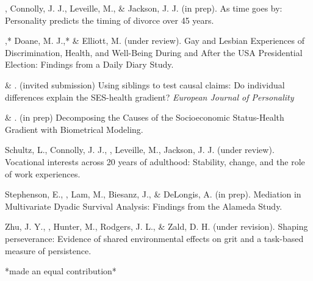 
\item\meb, Connolly, J. J., Leveille, M., \& Jackson, J. J. (in prep). As time goes by: Personality predicts the timing of divorce over 45 years. %
\item\meb,* Doane, M. J.,* \& Elliott, M. (under review). Gay and Lesbian Experiences of Discrimination, Health, and Well-Being During and After the USA Presidential Election: Findings from a Daily Diary Study.  %
\item \meb \& \joe. (invited submission) Using siblings to test causal claims: Do individual differences explain the SES-health gradient? \textit{European Journal of Personality}
\item \meb \& \joe. (in prep) Decomposing the Causes of the Socioeconomic Status-Health Gradient with Biometrical Modeling. %
\item Schultz, L., Connolly, J. J., \meb, Leveille, M., Jackson, J. J. (under review). Vocational interests across 20 years of adulthood: Stability, change, and the role of work experiences.%
\item Stephenson, E., \meb, Lam, M., Biesanz, J., \& DeLongis, A. (in prep). Mediation in Multivariate Dyadic Survival Analysis: Findings from the Alameda Study. %
\item Zhu, J. Y., \meb, Hunter, M., Rodgers, J. L., \& Zald, D. H. (under revision). Shaping perseverance: Evidence of shared environmental effects on grit and a task-based measure of persistence.
\vspace{-2mm}\begin{center}\footnotesize{*made an equal contribution*}\end{center} \vspace{-3mm}
\vspace{-2mm}\begin{center}\end{center} \vspace{-4mm}